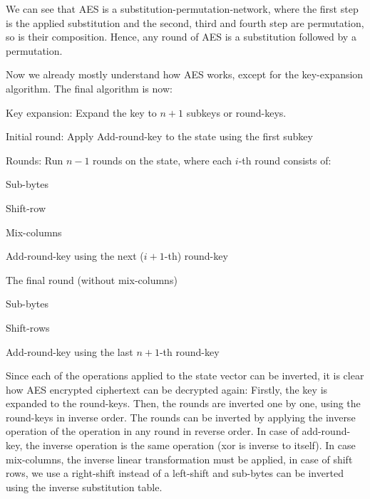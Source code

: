 We can see that AES is a substitution-permutation-network, where the first step is the applied substitution and the second, third and fourth step are permutation, so is their composition. Hence, any round of AES is a substitution followed by a permutation. 

Now we already mostly understand how AES works, except for the key-expansion algorithm. The final algorithm is now: 
\begin{compactenum}
  \item Key expansion: Expand the key to $n+1$ subkeys or round-keys. 
  \item Initial round:  Apply Add-round-key to the state using the first subkey
  \item Rounds: Run $n-1$ rounds on the state, where each $i$-th round consists of:
  \begin{compactenum}
  	\item Sub-bytes
  	\item Shift-row
  	\item Mix-columns
  	\item Add-round-key using the next ($i+1$-th) round-key
  \end{compactenum}
  \item The final round (without mix-columns)
  \begin{compactenum}
  	\item Sub-bytes
  	\item Shift-rows
  	\item Add-round-key using the last $n+1$-th round-key
  \end{compactenum}
\end{compactenum}

Since each of the operations applied to the state vector can be inverted, it is clear how AES encrypted ciphertext can be decrypted again: Firstly, the key is expanded to the round-keys. Then, the rounds are inverted one by one, using the round-keys in inverse order. The rounds can be inverted by applying the inverse operation of the operation in any round in reverse order. In case of add-round-key, the inverse operation is the same operation (xor is inverse to itself). In case mix-columns, the inverse linear transformation must be applied, in case of shift rows, we use a right-shift instead of a left-shift and sub-bytes can be inverted using the inverse substitution table. 